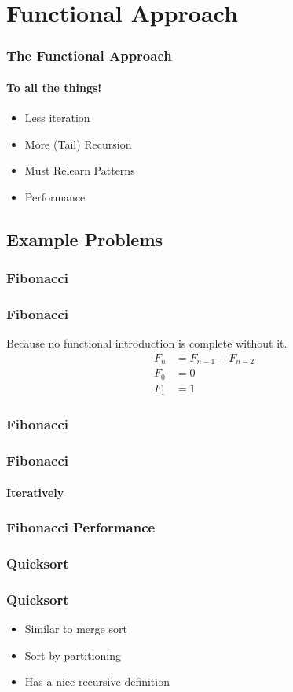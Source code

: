 \documentclass[english]{beamer}
\begin{document}
\section{Functional Approach}

\begin{frame}
\frametitle{The Functional Approach}
\framesubtitle{To all the things!}
\begin{itemize}
\item<1->{Less iteration} %
\item<2->{More (Tail) Recursion} %
\item<3->{Must Relearn Patterns}
\item<4->{Performance}
\end{itemize}
\end{frame}

\subsection{Example Problems}
\subsubsection{Fibonacci}
\begin{frame}
\frametitle{Fibonacci}
Because no functional introduction is complete without it.
\begin{align*}
F_n &= F_{n-1} + F_{n-2} \\
F_0 &= 0 \\
F_1 &= 1
\end{align*}
\end{frame}

\begin{frame}[fragile]
\frametitle{Fibonacci}

\end{frame}

\begin{frame}[fragile]
\frametitle{Fibonacci}
\framesubtitle{Iteratively}

\end{frame}

\begin{frame}[fragile]
\frametitle{Fibonacci Performance}

\end{frame}

\subsubsection{Quicksort}
\begin{frame}
\frametitle{Quicksort}
\begin{itemize}
\item{Similar to merge sort}
\item{Sort by partitioning}
\item{Has a nice recursive definition} %
\end{itemize}
\end{frame}
\end{document}

